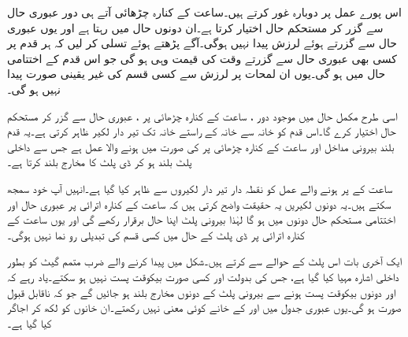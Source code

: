 اس پورے عمل پر دوبارہ غور کرتے ہیں۔ساعت کے کنارہ چڑھائی آتے ہی دور عبوری حال   سے گزر کر  مستحکم حال   اختیار کرتا ہے۔ان  دونوں حال میں    رہتا ہے اور یوں عبوری حال سے گزرتے ہوئے لرزش پیدا نہیں ہوگی۔آگے پڑھتے ہوئے  تسلی کر لیں کہ ہر قدم پر  کسی بھی عبوری حال سے گزرتے وقت   کی قیمت وہی ہو گی جو اس قدم کے اختتامی حال میں  ہو گی۔یوں ان لمحات پر لرزش سے کسی قسم کی غیر یقینی صورت پیدا نہیں ہو گی۔

اسی طرح مکمل حال  میں موجود دور ، ساعت کے کنارہ چڑھائی  پر ، عبوری حال   سے  گزر کر  مستحکم حال   اختیار کرے گا۔اس قدم کو خانہ   سے  خانہ   کے راستے خانہ   تک تیر دار لکیر  ظاہر کرتی ہے۔یہ قدم بلند بیرونی مداخل    اور  ساعت کے کنارہ چڑھائی پر  کی صورت میں   ہونے والا عمل ہے جس سے داخلی پلٹ بلند ہو  کر ڈی پلٹ کا  مخارج بلند   کرتا ہے۔

ساعت کے  پر ہونے والے  عمل کو نقطہ دار تیر دار لکیروں سے  ظاہر کیا  گیا ہے۔انہیں آپ خود سمجھ سکتے ہیں۔یہ دونوں لکیریں یہ   حقیقت  واضح کرتی ہیں کہ ساعت کے کنارہ اترائی پر عبوری حال اور اختتامی مستحکم حال دونوں میں   ہو گا لہٰذا  بیرونی پلٹ اپنا حال برقرار رکھے گی اور یوں ساعت کے کنارہ اترائی پر ڈی پلٹ کے حال میں کسی قسم کی تبدیلی رو نما نہیں ہوگی۔

ایک آخری بات اس پلٹ کے حوالے  سے کرتے ہیں۔شکل  میں   پیدا کرنے والے ضرب   متمم گیٹ کو  بطور  داخلی اشارہ   مہیا کیا گیا ہے، جس کی بدولت    اور  کسی صورت  بیکوقت پست نہیں ہو  سکتے۔یاد رہے کہ   اور   دونوں بیکوقت پست ہونے سے بیرونی پلٹ کے دونوں مخارج بلند ہو جائیں گے جو کہ ناقابل قبول صورت ہو گی۔یوں عبوری جدول میں  اور  کے خانے کوئی معنی نہیں رکھتے۔ان خانوں کو  لکھ کر  اجاگر کیا گیا ہے۔


